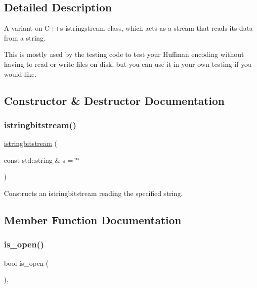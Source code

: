 \subsection{Detailed Description}
A variant on C++\textquotesingle{}s istringstream class, which acts as a stream that reads its data from a string. 

This is mostly used by the testing code to test your Huffman encoding without having to read or write files on disk, but you can use it in your own testing if you would like. 

\subsection{Constructor \& Destructor Documentation}
\mbox{\label{classistringbitstream_ae086e9a41bc91c4c64af792ff0aff81d}} 
\subsubsection{\texorpdfstring{istringbitstream()}{istringbitstream()}}
{\footnotesize\ttfamily \mbox{\hyperlink{classistringbitstream}{istringbitstream}} (\begin{DoxyParamCaption}\item[{const std\+::string \&}]{s = {\ttfamily \char`\"{}\char`\"{}} }\end{DoxyParamCaption})}



Constructs an istringbitstream reading the specified string. 



\subsection{Member Function Documentation}
\mbox{\label{classibitstream_a2f57f54d8c03b615bb31eee091d8a88a}} 
\subsubsection{\texorpdfstring{is\+\_\+open()}{is\_open()}}
{\footnotesize\ttfamily bool is\+\_\+open (\begin{DoxyParamCaption}{ }\end{DoxyParamCaption})\hspace{0.3cm}{\ttfamily [virtual]}, {\ttfamily [inherited]}}



